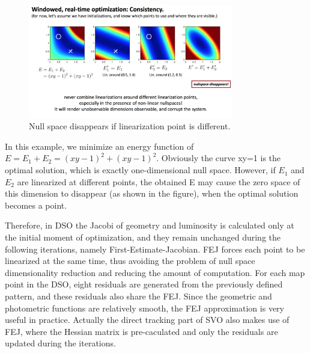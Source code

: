 \documentclass[a4paper,10pt]{article}
\begin{document}
	\begin{figure}[!thp]
		\centering
		\includegraphics[width=0.8\textwidth]{figs/nullspace.jpg}
		\caption{Null space disappears if linearization point is different.}
				\label{fig:nullspace-dso}
	\end{figure}

	In this example, we minimize an energy function of $E=E_1+E_2=(xy-1)^2+(xy-1)^2$. Obviously the curve xy=1 is the optimal solution, which is exactly one-dimensional null space. However, if $E_1$ and $E_2$ are linearized at different points, the obtained E may cause the zero space of this dimension to disappear (as shown in the figure), when the optimal solution becomes a point.
	
	Therefore, in DSO the Jacobi of geometry and luminosity is calculated only at the initial moment of optimization, and they remain unchanged during the following iterations, namely First-Estimate-Jacobian. FEJ forces each point to be linearized at the same time, thus avoiding the problem of null space dimensionality reduction and reducing the amount of computation. For each map point in the DSO, eight residuals are generated from the previously defined pattern, and these residuals also share the FEJ. Since the geometric and photometric functions are relatively smooth, the FEJ approximation is very useful in practice. Actually the direct tracking part of SVO \cite{forster2014svo} also makes use of FEJ, where the Hessian matrix is pre-caculated and only the residuals are updated during the iterations. 
			
	
	
	
\end{document}
